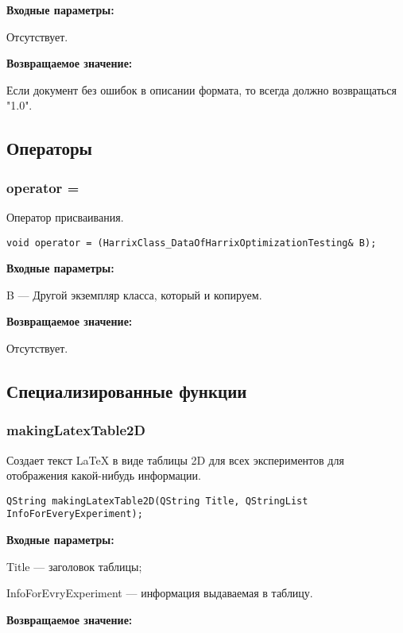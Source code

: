 \documentclass[a4paper,12pt]{article}
\begin{document}
\textbf{Входные параметры:}

Отсутствует.

\textbf{Возвращаемое значение:}

Если документ без ошибок в описании формата, то всегда должно возвращаться "1.0".


\subsection{Операторы}

\subsubsection{operator =}\label{operator =}

Оператор присваивания.


\begin{lstlisting}[label=code_syntax_operator =,caption=Синтаксис]
void operator = (HarrixClass_DataOfHarrixOptimizationTesting& B);
\end{lstlisting}

\textbf{Входные параметры:}

B --- Другой экземпляр класса, который и копируем.

\textbf{Возвращаемое значение:}

Отсутствует.


\subsection{Специализированные функции}

\subsubsection{makingLatexTable2D}\label{makingLatexTable2D}

Создает текст LaTeX в виде таблицы 2D для всех экспериментов для отображения какой-нибудь информации.


\begin{lstlisting}[label=code_syntax_makingLatexTable2D,caption=Синтаксис]
QString makingLatexTable2D(QString Title, QStringList InfoForEveryExperiment);
\end{lstlisting}

\textbf{Входные параметры:}

Title --- заголовок таблицы;

InfoForEvryExperiment --- информация выдаваемая в таблицу.

\textbf{Возвращаемое значение:}
\end{document}
